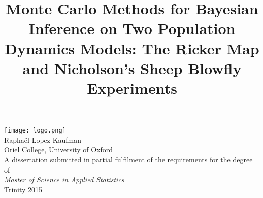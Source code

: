 \documentclass[12pt]{article}
\title{Monte Carlo Methods for Bayesian Inference on Two Population
	Dynamics Models: The Ricker Map and Nicholson's Sheep Blowfly Experiments}
\date{}
\begin{document}
	\maketitle 
	\thispagestyle{empty}
	\begin{center}
		\vspace{-0mm}
		\texttt{[image: logo.png]} \\
		\vspace{20mm}
		{\large Raphaël Lopez-Kaufman} \\
		\vspace{2mm}
		{\large Oriel College, University of Oxford} \\
		\vspace{45mm}
		A dissertation submitted in partial fulfilment of the requirements for the degree of \\
		\vspace{1mm}
		\textit{Master of Science in Applied Statistics} \\
		\vspace{1mm}
		Trinity 2015
	\end{center}
	
	\vspace{25 mm}
	
\end{document}

